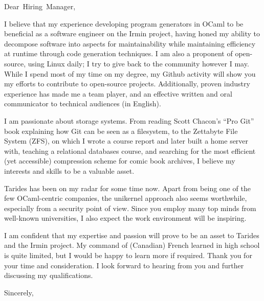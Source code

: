 \documentclass[
fontsize=12pt,
paper=letter,
parskip=half,
enlargefirstpage=on,    %
fromalign=right,        %
fromphone=on,           %
fromemail=on,
fromrule=aftername,     %
addrfield=off,           %
backaddress=off,         %
subject=beforeopening,  %
locfield=narrow,        %
foldmarks=off,           %
]{scrlttr2}
\renewcommand{\\}{\ {\large\textperiodcentered}\ }
\begin{document}

\begin{letter}{}


\opening{Dear~Hiring~Manager,}

I believe that my experience developing program generators in OCaml to be beneficial as a software engineer on the Irmin project, having honed my ability to decompose software into aspects for maintainability while maintaining efficiency at runtime through code generation techniques.
I am also a proponent of open-source, using Linux daily; I try to give back to the community however I may.
While I spend most of my time on my degree, my Github activity will show you my efforts to contribute to open-source projects.
Additionally, proven industry experience has made me a team player, and an effective written and oral communicator to technical audiences (in English).


I am passionate about storage systems.
From reading Scott Chacon's ``Pro Git'' book explaining how Git can be seen as a filesystem, to the Zettabyte File System (ZFS), on which I wrote a course report and later built a home server with, teaching a relational databases course, and searching for the most efficient (yet accessible) compression scheme for comic book archives, I believe my interests and skills to be a valuable asset.

Tarides has been on my radar for some time now.
Apart from being one of the few OCaml-centric companies, the unikernel approach also seems worthwhile, especially from a security point of view.
Since you employ many top minds from well-known universities, I also expect the work environment will be inspiring.

I am confident that my expertise and passion will prove to be an asset to Tarides and the Irmin project.
My command of (Canadian) French learned in high school is quite limited, but I would be happy to learn more if required. 
Thank you for your time and consideration.
I look forward to hearing from you and further discussing my qualifications.
\closing{Sincerely,}


\end{letter}
\end{document}
